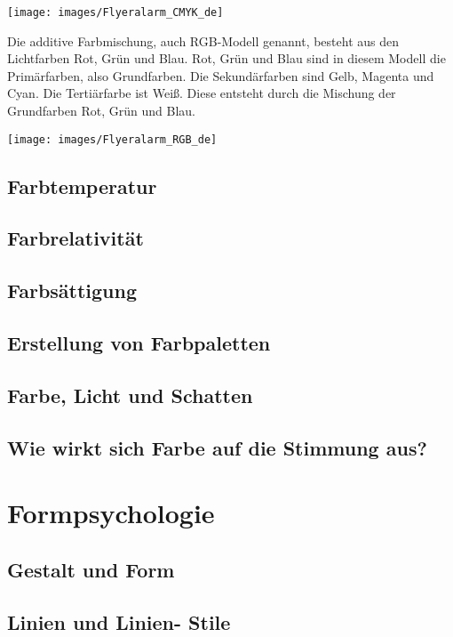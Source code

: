 \centerfirst
\texttt{[image: images/Flyeralarm\_CMYK\_de]}


Die additive Farbmischung, auch RGB-Modell genannt, besteht aus den Lichtfarben Rot, Grün und Blau. Rot, Grün und Blau sind in diesem Modell die Primärfarben, also Grundfarben. Die Sekundärfarben sind Gelb, Magenta und Cyan. Die Tertiärfarbe ist Weiß. Diese entsteht durch die Mischung der Grundfarben Rot, Grün und Blau.

\texttt{[image: images/Flyeralarm\_RGB\_de]}



\subsection{Farbtemperatur}

\subsection{Farbrelativität}

\subsection{Farbsättigung}

\subsection{Erstellung von Farbpaletten}

\subsection{Farbe, Licht und Schatten}

\subsection{Wie wirkt sich Farbe auf die Stimmung aus?}



\section{Formpsychologie}

\subsection{Gestalt und Form}

\subsection{Linien und Linien- Stile}

